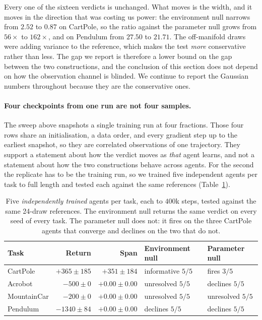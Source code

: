 \documentclass[10pt,twocolumn]{article}
\begin{document}
Every one of the sixteen verdicts is unchanged. What moves is the width, and it
moves in the direction that was costing us power: the environment null narrows
from $2.52$ to $0.87$ on CartPole, so the ratio against the parameter null grows
from $56\times$ to $162\times$, and on Pendulum from $27.50$ to $21.71$. The
off-manifold draws were adding variance to the reference, which makes the test
\emph{more} conservative rather than less. The gap we report is therefore a lower
bound on the gap between the two constructions, and the conclusion of this
section does not depend on how the observation channel is blinded. We continue to
report the Gaussian numbers throughout because they are the conservative ones.

\paragraph{Four checkpoints from one run are not four samples.}
\label{par:seeds}
The sweep above snapshots a single training run at four fractions. Those four
rows share an initialisation, a data order, and every gradient step up to the
earliest snapshot, so they are correlated observations of one trajectory. They
support a statement about how the verdict moves as \emph{that} agent learns, and
not a statement about how the two constructions behave across agents. For the
second the replicate has to be the training run, so we trained five independent
agents per task to full length and tested each against the same references
(Table~\ref{tab:seeds}).

\begin{table}[t]
\centering\small
\caption{Five \emph{independently trained} agents per task, each to $400$k steps,
tested against the same 24-draw references. The environment null returns the same
verdict on every seed of every task. The parameter null does not: it fires on the
three CartPole agents that converge and declines on the two that do not.}
\label{tab:seeds}
\begin{tabular}{lrrll}
\toprule
Task & Return & Span & Environment null & Parameter null \\
\midrule
CartPole    & $+365 \pm 185$ & $+351 \pm 184$ & informative $5/5$ & fires $3/5$ \\
Acrobot     & $-500 \pm 0$ & $+0.00 \pm 0.00$ & unresolved $5/5$ & declines $5/5$ \\
MountainCar & $-200 \pm 0$ & $+0.00 \pm 0.00$ & unresolved $5/5$ & unresolved $5/5$ \\
Pendulum    & $-1340 \pm 84$ & $+0.00 \pm 0.00$ & declines $5/5$ & declines $5/5$ \\
\bottomrule
\end{tabular}
\end{table}
\end{document}
